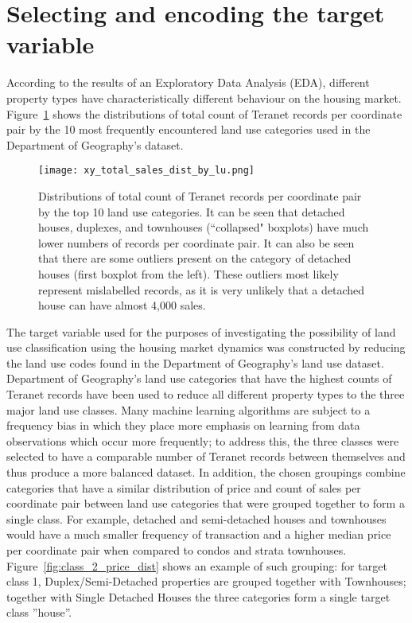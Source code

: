 \section{Selecting and encoding the target variable} \label{sec:select_encode_target}

According to the results of an Exploratory Data Analysis (EDA), different property types have characteristically different behaviour on the housing market.
Figure~\ref{fig:xy_total_sales_dist_by_lu} shows the distributions of total count of Teranet records per coordinate pair by the 10 most frequently encountered land use categories used in the Department of Geography's dataset.

\begin{figure}[hbt!]
    \centering
    \texttt{[image: xy\_total\_sales\_dist\_by\_lu.png]}
    \caption{Distributions of total count of Teranet records per coordinate pair by the top 10 land use categories.
    It can be seen that detached houses, duplexes, and townhouses (``collapsed" boxplots) have much lower numbers of records per coordinate pair.
    It can also be seen that there are some outliers present on the category of detached houses (first boxplot from the left).
    These outliers most likely represent mislabelled records, as it is very unlikely that a detached house can have almost 4,000 sales.}
    \label{fig:xy_total_sales_dist_by_lu}
\end{figure}

The target variable used for the purposes of investigating the possibility of land use classification using the housing market dynamics was constructed by reducing the land use codes found in the Department of Geography's land use dataset.
Department of Geography's land use categories that have the highest counts of Teranet records have been used to reduce all different property types to the three major land use classes.
Many machine learning algorithms are subject to a frequency bias in which they place more emphasis on learning from data observations which occur more frequently;
to address this, the three classes were selected to have a comparable number of Teranet records between themselves and thus produce a more balanced dataset.
In addition, the chosen groupings combine categories that have a similar distribution of price and count of sales per coordinate pair between land use categories that were grouped together to form a single class.
For example, detached and semi-detached houses and townhouses would have a much smaller frequency of transaction and a higher median price per coordinate pair when compared to condos and strata townhouses.
Figure~\ref{fig:class_2_price_dist} shows an example of such grouping: for target class 1, Duplex/Semi-Detached properties are grouped together with Townhouses;
together with Single Detached Houses the three categories form a single target class ''house''.

